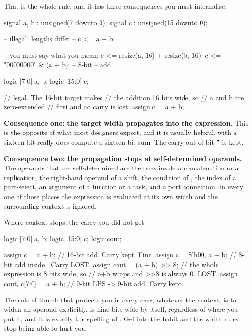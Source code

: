 That is the whole rule, and it has three consequences you must internalise.

\begin{rosetta}
\begin{rleft}
signal a, b : unsigned(7 downto 0);
signal c    : unsigned(15 downto 0);

-- illegal: lengths differ
-- c <= a + b;

-- you must say what you mean:
c <= resize(a, 16) + resize(b, 16);
c <= "00000000" & (a + b);  -- 8-bit
                            -- add
\end{rleft}
\begin{rright}
logic  [7:0] a, b;
logic [15:0] c;

// legal. The 16-bit target makes
// the addition 16 bits wide, so
// a and b are zero-extended
// first and no carry is lost:
assign c = a + b;
\end{rright}
\end{rosetta}

\textbf{Consequence one: the target width propagates into the expression.} This
is the opposite of what most \VHDL{} designers expect, and it is usually
helpful.  with a sixteen-bit  really does compute a
sixteen-bit sum. The carry out of bit 7 is kept.

\textbf{Consequence two: the propagation stops at self-determined operands.}
The operands that are self-determined are the ones inside a concatenation or a
replication, the right-hand operand of a shift, the condition of , the
index of a part-select, an argument of a function or a task, and a port
connection. In every one of those places the expression is evaluated at its
own width and the surrounding context is ignored.

\begin{gotcha}{Where context stops: the carry you did not get}
\begin{svcode}
logic  [7:0] a, b;
logic [15:0] c;
logic        cout;

assign c    = a + b;             // 16-bit add. Carry kept. Fine.
assign c    = {8'h00, a + b};    // 8-bit add inside {}. Carry LOST.
assign cout = (a + b) >> 8;      // the whole expression is 8 bits wide, so
                                 // a+b wraps and >>8 is always 0. LOST.
assign {cout, c[7:0]} = a + b;   // 9-bit LHS -> 9-bit add. Carry kept.
\end{svcode}
The rule of thumb that protects you in every case, whatever the context, is to
widen an operand explicitly.  is nine bits wide by
itself, regardless of where you put it, and it is exactly the \SV{} spelling of
. Get into the habit and the width rules stop
being able to hurt you.
\end{gotcha}

